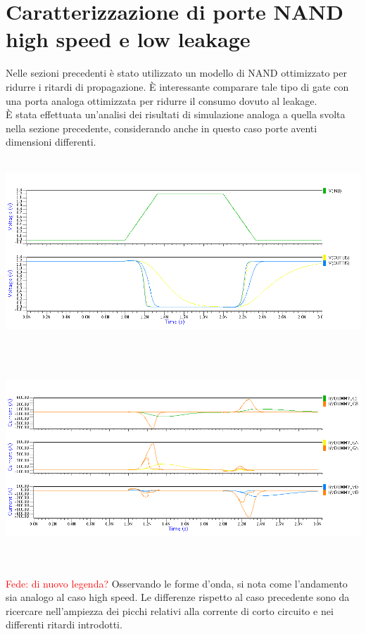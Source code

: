 \documentclass[11pt,  english, makeidx, a4paper, titlepage, oneside]{book}
\begin{document}
\section{Caratterizzazione di porte NAND high speed e low leakage}
Nelle sezioni precedenti è stato utilizzato un modello di NAND ottimizzato per ridurre i ritardi di propagazione. È interessante comparare tale tipo di gate con una porta analoga ottimizzata per ridurre il consumo dovuto al leakage.
\\
È stata effettuata un'analisi dei risultati di simulazione analoga a quella svolta nella sezione precedente, considerando anche in questo caso porte aventi dimensioni differenti.
\\\\
\centerline{\includegraphics[width=14cm]{./img/Lab_5/waveform_6.png}}
\\\\
\centerline{\includegraphics[width=14cm]{./img/Lab_5/waveform_7.png}}
\\\\
\textcolor{red}{Fede: di nuovo legenda?}
Osservando le forme d'onda, si nota come l'andamento sia analogo al caso high speed. Le differenze rispetto al caso precedente sono da ricercare nell'ampiezza dei picchi relativi alla corrente di corto circuito e nei differenti ritardi introdotti.
\\\\
\end{document}
